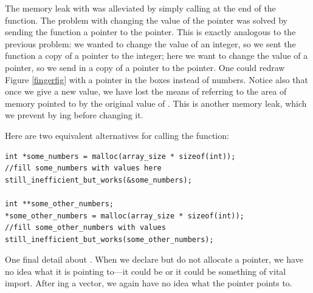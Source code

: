 
The memory leak with  was alleviated by simply
calling  at the end of the function. The problem with
changing the value of the pointer was solved by sending the function a
pointer to the pointer. This is exactly analogous to the previous problem:
we wanted to change the value of an integer, so we sent the function a
copy of a pointer to the integer; here we want to change the value of a
pointer, so we send in a copy of a pointer to the pointer. One could
redraw Figure \ref{fingerfig} with a pointer in the boxes instead of
numbers. Notice also
that once we give  a new value, we have lost the
means of referring to the area of memory pointed to by the original
value of . This is another memory leak, which we
prevent by ing  before changing it.

Here are two equivalent alternatives for calling the function:
\begin{lstlisting}
int *some_numbers = malloc(array_size * sizeof(int));
//fill some_numbers with values here
still_inefficient_but_works(&some_numbers);

int **some_other_numbers;
*some_other_numbers = malloc(array_size * sizeof(int));
//fill some_other_numbers with values
still_inefficient_but_works(some_other_numbers);
\end{lstlisting}

One final detail about . When we declare but do not allocate a
pointer, we have no idea what it is pointing to---it could be 
or it could be something of vital import. After ing a vector,
we again have no idea what the pointer points to.

